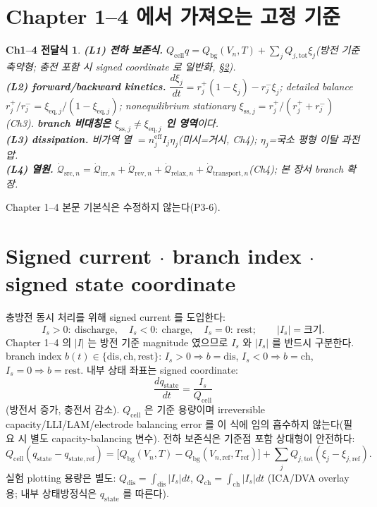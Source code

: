 \documentclass[11pt,a4paper]{article}
\newtheorem*{linkbox}{Ch1--4 전달식}
\newcommand{\eff}{\mathrm{eff}}
\newcommand{\eq}{\mathrm{eq}}
\newcommand{\tot}{\mathrm{tot}}
\newcommand{\bg}{\mathrm{bg}}
\newcommand{\cell}{\mathrm{cell}}
\newcommand{\irr}{\mathrm{irr}}
\newcommand{\rev}{\mathrm{rev}}
\newcommand{\src}{\mathrm{src}}
\newcommand{\rlx}{\mathrm{relax}}
\newcommand{\transp}{\mathrm{transport}}
\newcommand{\dis}{\mathrm{dis}}
\newcommand{\chg}{\mathrm{ch}}
\newcommand{\rst}{\mathrm{rest}}
\newcommand{\stt}{\mathrm{state}}
\newcommand{\sstat}{\mathrm{ss}}
\begin{document}
\section{Chapter 1--4 에서 가져오는 고정 기준}\label{sec:ch5_inherit}
\begin{linkbox}
\textbf{(L1) 전하 보존식.} $Q_\cell q=Q_\bg(V_n,T)+\sum_j Q_{j,\tot}\xi_j$(방전 기준 축약형; 충전 포함 시
signed coordinate 로 일반화, \S\ref{sec:ch5_signed}).\\
\textbf{(L2) forward/backward kinetics.} $\dfrac{d\xi_j}{dt}=r_j^+(1-\xi_j)-r_j^-\xi_j$; detailed balance
$r_j^+/r_j^-=\xi_{\eq,j}/(1-\xi_{\eq,j})$; nonequilibrium stationary $\xi_{\sstat,j}=r_j^+/(r_j^++r_j^-)$
(Ch3). \textbf{branch 비대칭은 $\xi_{\sstat,j}\ne\xi_{\eq,j}$ 인 영역}이다.\\
\textbf{(L3) dissipation.} 비가역 열 $=n_j^{\eff}I_j\eta_j$(미시=거시, Ch4); $\eta_j$=국소 평형 이탈 과전압.\\
\textbf{(L4) 열원.} $\dot{\mathcal Q}_{\src,n}=\dot{\mathcal Q}_{\irr,n}+\dot{\mathcal Q}_{\rev,n}+\dot{\mathcal Q}_{\rlx,n}+\dot{\mathcal Q}_{\transp,n}$(Ch4); 본 장서 branch 확장.
\end{linkbox}
Chapter 1--4 본문 기본식은 수정하지 않는다(P3-6).

\section{Signed current $\cdot$ branch index $\cdot$ signed state coordinate}\label{sec:ch5_signed}
충방전 동시 처리를 위해 signed current 를 도입한다:
\begin{equation}
I_s>0:\ \text{discharge},\quad I_s<0:\ \text{charge},\quad I_s=0:\ \text{rest};\qquad |I_s|=\text{크기}.
\label{eq:ch5_signed_current}
\end{equation}
Chapter 1--4 의 $|I|$ 는 방전 기준 magnitude 였으므로 $I_s$ 와 $|I_s|$ 를 반드시 구분한다. branch index
$b(t)\in\{\dis,\chg,\rst\}$: $I_s>0\Rightarrow b=\dis$, $I_s<0\Rightarrow b=\chg$, $I_s=0\Rightarrow b=\rst$.
내부 상태 좌표는 signed coordinate:
\begin{equation}
\frac{dq_\stt}{dt}=\frac{I_s}{Q_\cell}
\label{eq:ch5_qstate}
\end{equation}
(방전서 증가, 충전서 감소). $Q_\cell$ 은 기준 용량이며 irreversible capacity/LLI/LAM/electrode balancing
error 를 이 식에 임의 흡수하지 않는다(필요 시 별도 capacity-balancing 변수). 전하 보존식은 기준점 포함 상대형이 안전하다:
\begin{equation}
Q_\cell(q_\stt-q_{\stt,\mathrm{ref}})=\big[Q_\bg(V_n,T)-Q_\bg(V_{n,\mathrm{ref}},T_{\mathrm{ref}})\big]+\sum_jQ_{j,\tot}(\xi_j-\xi_{j,\mathrm{ref}}).
\label{eq:ch5_relbalance}
\end{equation}
실험 plotting 용량은 별도: $Q_\dis=\int_\dis|I_s|dt$, $Q_\chg=\int_\chg|I_s|dt$ (ICA/DVA overlay 용; 내부
상태방정식은 $q_\stt$ 를 따른다).
\end{document}

